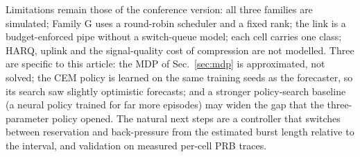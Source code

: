 \documentclass[journal]{IEEEtran}
\begin{document}
Limitations remain those of the conference version: all three families are simulated; Family G uses a round-robin scheduler and a fixed rank; the link is a budget-enforced pipe without a switch-queue model; each cell carries one class; HARQ, uplink and the signal-quality cost of compression are not modelled. Three are specific to this article: the MDP of Sec.~\ref{sec:mdp} is approximated, not solved; the CEM policy is learned on the same training seeds as the forecaster, so its search saw slightly optimistic forecasts; and a stronger policy-search baseline (a neural policy trained for far more episodes) may widen the gap that the three-parameter policy opened. The natural next steps are a controller that switches between reservation and back-pressure from the estimated burst length relative to the interval, and validation on measured per-cell PRB traces.
\end{document}
